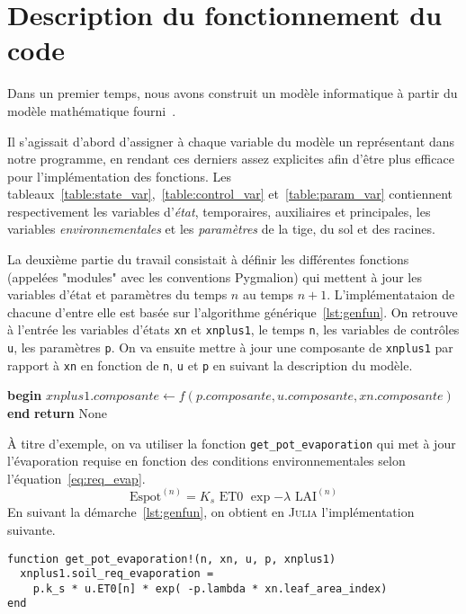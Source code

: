 \section{Description du fonctionnement du code}
Dans un premier temps, nous avons construit un modèle informatique à partir
du modèle mathématique fourni~\cite{lnas_model_wheat}.

Il s'agissait d'abord d'assigner à chaque variable du modèle un représentant
dans notre programme, en rendant ces derniers assez explicites
afin d'être plus efficace pour l'implémentation des fonctions.
Les tableaux~\ref{table:state_var},~\ref{table:control_var} et~\ref{table:param_var}
contiennent respectivement les variables d'\emph{état}, temporaires, auxiliaires et principales, 
les variables \emph{environnementales} et les \emph{paramètres} de la tige, du sol et des racines.

La deuxième partie du travail consistait à définir les différentes fonctions (appelées "modules" avec les conventions Pygmalion)
qui mettent à jour les variables d'état et paramètres du 
temps $n$ au temps $n+1$.
L'implémentataion de chacune d'entre elle est basée sur l'algorithme générique~\ref{lst:genfun}.
On retrouve à l'entrée les variables d'états \texttt{xn} et \texttt{xnplus1},
le temps \texttt{n}, les variables de contrôles \texttt{u}, les paramètres \texttt{p}.
On va ensuite mettre à jour une composante de \lstinline|xnplus1| par rapport à \texttt{xn} en fonction de \texttt{n}, \texttt{u} et \texttt{p} en suivant la description du modèle.

\begin{algorithm}[t]
  \caption{Algorithme générique qui sert de base pour l'implémentation
des fonctions. La fonction $f$ n'est pas définie mais sert de placeholder
pour représenter les opérations nécessaires à la mise à jour de \lstinline|xnplus1|.}
\label{lst:genfun}
  \begin{algorithmic}[1]
    \State \textbf{begin}
      \State $xnplus1.composante \gets f(p.composante, u.composante, xn.composante)$
    \State \textbf{end}
    \State \textbf{return} None
    \EndProcedure
  \end{algorithmic}
\end{algorithm}


À titre d'exemple, on va utiliser la fonction \lstinline|get_pot_evaporation| qui met
à jour l'évaporation requise en fonction des conditions environnementales
selon l'équation~\ref{eq:req_evap}.
\begin{equation}
  \text{Espot}^{(n)} = K_s \text{ ET0 } \exp{-\lambda \text{ LAI}^{(n)}}
  \label{eq:req_evap}
\end{equation}
En suivant la démarche~\ref{lst:genfun}, on obtient en \textsc{Julia}
l'implémentation suivante.
\begin{lstlisting}
function get_pot_evaporation!(n, xn, u, p, xnplus1)
  xnplus1.soil_req_evaporation = 
    p.k_s * u.ET0[n] * exp( -p.lambda * xn.leaf_area_index) 
end
\end{lstlisting}



